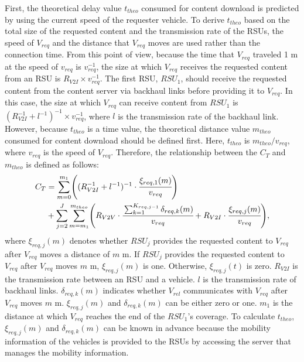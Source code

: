 \documentclass[electronics,aricle,accept,pdftex,moreauthors]{Definitions/mdpi}
\begin{document}
First, the theoretical delay value ${t}_{theo}$ consumed for content download is predicted by using the current speed of the requester vehicle.
To derive $t_{theo}$ based on the total size of the requested content and the transmission rate of the RSUs, the speed of $V_{req}$ and the distance that $V_{req}$ moves are used rather than the connection time. From this point of view, because the time that $V_{req}$ traveled 1 m at the speed of $v_{req}$ is $v_{req}^{-1}$, the size at which $V_{req}$ receives the requested content from an RSU is $R_{V2I} \times v_{req}^{-1}$.
The first RSU, $RSU_{1}$, should receive the requested content from the content server via backhaul links before providing it to $V_{req}$.
In this case, the size at which $V_{req}$ can receive content from $RSU_{1}$ is $(R_{V2I}^{-1} + l^{-1})^{-1} \times v_{req}^{-1}$, where $l$ is the transmission rate of the backhaul link.
However, because $t_{theo}$ is a time value, the theoretical distance value $m_{theo}$ consumed for content download should be defined first.
Here, $t_{theo}$ is $m_{theo} / v_{req}$, where $v_{req}$ is the speed of $V_{req}$.
Therefore, the relationship between the $C_{T}$ and $m_{theo}$ is defined as follows:
\begin{equation}
    \begin{split}
        C_{T}&=\sum_{m=0}^{m_{1}}\left( (R_{V2I}^{-1} + l^{-1})^{-1} \cdot\cfrac{\xi_{req, 1}(m)}{v_{req}}\right) \\
        &+\sum_{j=2}^{J}\sum_{m=m_{1}}^{m_{theo}}\left(R_{V2V}\cdot\cfrac{\sum_{k=1}^{K_{req,j-1}}\delta_{req, k}(m)}{v_{req}}+R_{V2I}\cdot\cfrac{\xi_{req, j}(m)}{v_{req}} \right) ,
    \end{split}
\end{equation}
where ${\xi}_{req, j}(m)$ denotes whether $RSU_{j}$ provides the requested content to $V_{req}$ after $V_{req}$ moves a distance of $m$ m. If $RSU_{j}$ provides the requested content to $V_{req}$ after $V_{req}$ moves $m$ m, ${\xi}_{req, j}(m)$ is one. Otherwise, ${\xi}_{req, j}(t)$ is zero. ${R}_{V2I}$ is the transmission rate between an RSU and a vehicle. $l$ is the transmission rate of backhaul links. ${\delta}_{req, k}(m)$ indicates whether ${V}_{rel}$ communicates with ${V}_{req}$ after $V_{req}$ moves $m$ m. ${\xi}_{req, j}(m)$ and ${\delta}_{req, k}(m)$ can be either zero or one.
$m_{1}$ is the distance at which $V_{req}$ reaches the end of the $RSU_{1}$'s coverage.
To calculate ${t}_{theo}$, ${\xi}_{req, j}(m)$ and ${\delta}_{req, k}(m)$ can be known in advance because the mobility information of the vehicles is provided to the RSUs by accessing the server that manages the mobility information.
\end{document}
